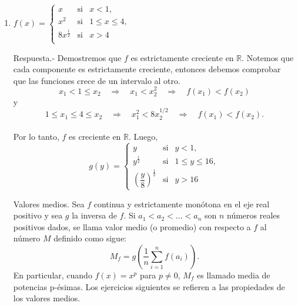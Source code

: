 \begin{enumerate}[\bfseries 1.]
    \item $f(x)=\left\{\begin{array}{lcl}
		x & \mbox{si} & x<1, \\
		x^2 & \mbox{si} & 1 \leq x\leq 4, \\
		8x^{\frac{1}{2}} & \mbox{si} & x>4 \\
		\end{array}\right.$
		\vspace{.5cm}

	Respuesta.- \; Demostremos que $f$ es estrictamente creciente en $\mathbb{R}$. Notemos que cada componente es estrictamente creciente, entonces debemos comprobar que las funciones crece de un intervalo al otro.
	$$x_1<1\leq x_2\quad \Rightarrow \quad x_1<x^2_2 \quad \Rightarrow \quad f(x_1)<f(x_2)$$
	y
	$$1\leq x_1 \leq 4 \leq x_2\quad \Rightarrow \quad x_1^2 < 8x_2^{1/2} \quad \Rightarrow \quad f(x_1)<f(x_2).$$\\
	Por lo tanto, $f$ es creciente en $\mathbb{R}$. Luego,\\

	$$g(y)=\left\{\begin{array}{lcl}
	    y & \mbox{si} & y<1, \\
	    y^{\frac{1}{2}} & \mbox{si} & 1 \leq y \leq 16, \\
	    \left(\dfrac{y}{8}\right)^{\frac{1}{2}} & \mbox{si} & y>16
	\end{array}\right.$$
	\vspace{.7cm}

    Valores medios. Sea $f$ continua y estrictamente monótona en el eje real positivo y sea $g$ la inversa de $f$. Si $a_1<a_2<\ldots<a_n$ son $n$ números reales positivos dados, se llama valor medio (o promedio) con respecto a $f$ al número $M$ definido como sigue:
    $$M_f=g\left(\dfrac{1}{n}\sum_{i=1}^n f(a_i)\right).$$
    En particular, cuando $f(x)=x^p$ para $p\neq 0$, $M_f$ es llamado media de potencias p-ésimas. Los ejercicios siguientes se refieren a las propiedades de los valores medios.\\\\ 


\end{enumerate}
